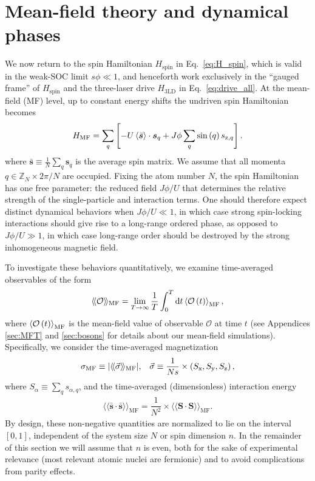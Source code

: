 \documentclass[nofootinbib,twocolumn]{revtex4-2}
\renewcommand{\t}{\text} %
\newcommand{\f}[2]{\dfrac{#1}{#2}} %
\newcommand{\p}[1]{\left(#1\right)} %
\renewcommand{\sp}[1]{\left[#1\right]} %
\newcommand{\bk}{\Braket} %
\renewcommand{\v}{\bm} %
\renewcommand{\c}{\cdot} %
\renewcommand{\dd}{\text{d}} %
\newcommand{\bbk}[1]{\langle\!\langle #1 \rangle\!\rangle}
\newcommand{\1}{\mathds{1}}
\newcommand{\x}{\text{x}}
\newcommand{\y}{\text{y}}
\newcommand{\z}{\text{z}}
\newcommand{\ZZ}{\mathbb{Z}}
\renewcommand{\O}{\mathcal{O}}
\newcommand{\spin}{\text{spin}}
\newcommand{\MF}{\text{MF}}
\renewcommand{\ss}{\bar{\v s}\c\bar{\v s}}
\begin{document}
\section{Mean-field theory and dynamical phases}
\label{sec:mean_field}

We now return to the spin Hamiltonian $H_\spin$ in Eq.~\eqref{eq:H_spin}, which is valid in the weak-SOC limit $s\phi\ll1$, and henceforth work exclusively in the ``gauged frame'' of $H_\spin$ and the three-laser drive $H_{\t{3LD}}$ in Eq.~\eqref{eq:drive_all}.
At the mean-field (MF) level, up to constant energy shifts the undriven spin Hamiltonian becomes
\begin{align}
  H_\MF = \sum_q\sp{-U\bk{\bar{\v s}}\c\v s_q
    + J\phi \sum_q \sin\p{q} s_{\z,q}}.
  \label{eq:H_MF}
\end{align}
where $\bar{\v s}\equiv\frac1N\sum_q\v s_q$ is the average spin matrix.
We assume that all momenta $q\in\ZZ_N\times 2\pi/N$ are occupied.
Fixing the atom number $N$, the spin Hamiltonian has one free parameter: the reduced field $J\phi/U$ that determines the relative strength of the single-particle and interaction terms.
One should therefore expect distinct dynamical behaviors when $J\phi/U\ll1$, in which case strong spin-locking interactions should give rise to a long-range ordered phase, as opposed to $J\phi/U\gg1$, in which case long-range order should be destroyed by the strong inhomogeneous magnetic field.

To investigate these behaviors quantitatively, we examine time-averaged observables of the form
\begin{align}
  \bbk{\O}_\MF = \lim_{T\to\infty} \f1T \int_0^T \dd t \bk{\O\p{t}}_\MF,
\end{align}
where $\bk{\O\p{t}}_\MF$ is the mean-field value of observable $\O$ at time $t$ (see Appendices \ref{sec:MFT} and \ref{sec:bosons} for details about our mean-field simulations).
Specifically, we consider the time-averaged magnetization
\begin{align}
  \sigma_\MF \equiv \abs{\bbk{\vec\sigma}_\MF},
  &&
  \vec\sigma \equiv \f1{Ns} \times \p{S_\x,S_\y,S_\z},
\end{align}
where $S_\alpha \equiv \sum_q s_{\alpha,q}$, and the time-averaged (dimensionless) interaction energy
\begin{align}
  \bbk{\ss}_\MF = \f1{N^2} \times \bbk{\v S\c\v S}_\MF.
\end{align}
By design, these non-negative quantities are normalized to lie on the interval $[0,1]$, independent of the system size $N$ or spin dimension $n$.
In the remainder of this section we will assume that $n$ is even, both for the sake of experimental relevance (most relevant atomic nuclei are fermionic) and to avoid complications from parity effects.
\end{document}
